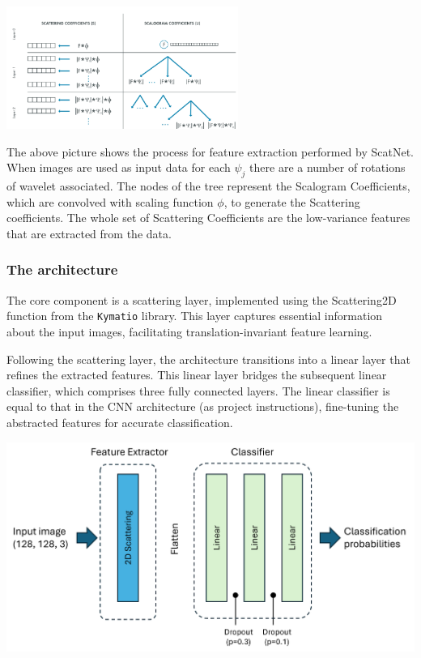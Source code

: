 \documentclass[11pt]{article}
\newenvironment{Figure}
  {\par\medskip\noindent\minipage{\linewidth}}
  {\endminipage\par\medskip}
\begin{document}
\begin{multicols*}{2}
\begin{Figure}
    \centering
    \includegraphics[width=\linewidth,height=4cm]
    {images/scatnet_flow_better_image.png}
    \label{fig:scatnet-flow}
\end{Figure}

The above picture shows the process for feature extraction performed by ScatNet. When images are used as input data for each $\psi_j$ there are a number of rotations of wavelet associated. The nodes of the tree represent the Scalogram Coefficients, which are convolved with scaling function $\phi$, to generate the Scattering coefficients. The whole set of Scattering Coefficients are the low-variance features that are extracted from the data.


\subsubsection{The architecture}
The core component is a scattering layer, implemented using the Scattering2D function from the \texttt{Kymatio} library. This layer captures essential information about the input images, facilitating translation-invariant feature learning.

Following the scattering layer, the architecture transitions into a linear layer that refines the extracted features. This linear layer bridges the subsequent linear classifier, which comprises three fully connected layers. The linear classifier is equal to that in the CNN architecture (as project instructions), fine-tuning the abstracted features for accurate classification.

\begin{Figure}
    \centering
    \includegraphics[width=\linewidth]{images/scatnet_architecture.png}
    \label{fig:scatnet-architecture}
\end{Figure}


\end{multicols*}
\end{document}
